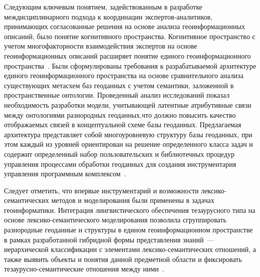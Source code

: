 \begin{multicols}{2}
     Следующим ключевым понятием, задействованным в разработке 
междисциплинарного подхода к координации экс\-пер\-тов-ана\-ли\-ти\-ков, 
принимающих согласованные решения на основе анализа 
геоинформационных описаний, было понятие когнитивного пространства. 
Когнитивное пространство с учетом многофакторности взаимодействия 
экспертов на основе геоинформационных описаний расширяет понятие 
единого геоинформационного пространства~\cite{25-ko}. Были 
сформулированы требования к разрабатываемой архитектуре единого 
геоинформационного пространства на основе сравнительного анализа 
существующих метасхем баз геоданных с учетом семантики, заложенной в 
пространственные онтологии. Проведенный анализ исследований показал 
необходимость разработки модели, учитывающей латентные атрибутивные 
связи между онтологиями разнородных геоданных,\linebreak что должно повысить 
качество отображаемых связей в концептуальной схеме базы геоданных. 
Предлагаемая архитектура представляет собой многоуровневую структуру 
базы геоданных, при этом \mbox{каждый} из уровней ориентирован на решение 
определенного класса задач и содержит определенный набор 
пользовательских и библиотечных процедур управления процессами 
обработки геоданных для создания инструментария управления 
про\-грам\-мным комплексом~\cite{23-ko}.
     
     Следует отметить, что впервые инструментарий и возможности 
     лек\-си\-ко-се\-ман\-ти\-че\-ских методов и моделирования были 
применены в задачах гео\-информатики. Интеграция лингвистического 
обеспе\-чения тезаурусного типа на основе лек\-си\-ко-се\-ман\-ти\-че\-ско\-го 
моделирования позволила сгруппировать разнородные геоданные и 
структуры в едином геоинформационном пространстве в рамках 
разработанной гибридной формы представления знаний~--- иерархической 
классификации с элементами лек\-си\-ко-се\-ман\-ти\-че\-ских отношений, а 
также выявить объекты и понятия данной предметной области и фиксировать 
те\-зау\-рус\-но-се\-ман\-ти\-че\-ские отношения между ними~\cite{23-ko}.
     

\end{multicols}
